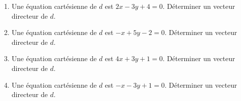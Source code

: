 
\begin{enumerate}
	\item Une équation cartésienne de $d$ est $2x-3y+4=0$. Déterminer un vecteur directeur de $d$.
 	\item Une équation cartésienne de $d$ est $-x+5y-2=0$. Déterminer un vecteur directeur de $d$.
	\item Une équation cartésienne de $d$ est $4x+3y+1=0$. Déterminer un vecteur directeur de $d$.
 	\item Une équation cartésienne de $d$ est $-x-3y+1=0$. Déterminer un vecteur directeur de $d$.
\end{enumerate}